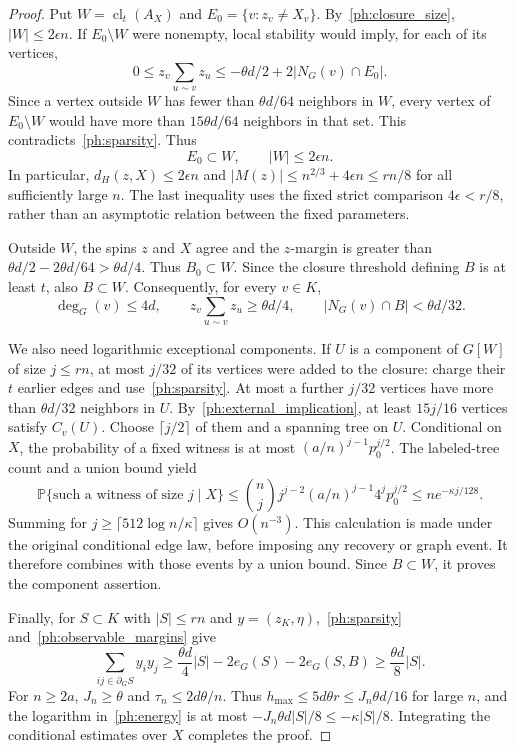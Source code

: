\documentclass[11pt]{article}
\def\P{\mathbb{P}}
\numberwithin{equation}{section}
\begin{document}
\begin{proof}
Put $W=\operatorname{cl}_t(A_X)$ and $E_0=\{v:z_v\ne X_v\}$. By~\eqref{ph:closure_size}, $|W|\le2\epsilon n$. If $E_0\setminus W$ were nonempty, local stability would imply, for each of its vertices,
\[
    0\le z_v\sum_{u\sim v}z_u
       \le-\theta d/2+2|N_G(v)\cap E_0|.
\]
Since a vertex outside $W$ has fewer than $\theta d/64$ neighbors in $W$, every vertex of $E_0\setminus W$ would have more than $15\theta d/64$ neighbors in that set. This contradicts~\eqref{ph:sparsity}. Thus
\begin{equation}\label{ph:confined}
    E_0\subset W,\qquad |W|\le2\epsilon n.
\end{equation}
In particular, $d_H(z,X)\le2\epsilon n$ and
$|M(z)|\le n^{2/3}+4\epsilon n\le rn/8$ for all sufficiently large $n$. The last inequality uses the fixed strict comparison $4\epsilon<r/8$, rather than an asymptotic relation between the fixed parameters.

Outside $W$, the spins $z$ and $X$ agree and the $z$-margin is greater than $\theta d/2-2\theta d/64>\theta d/4$. Thus $B_0\subset W$. Since the closure threshold defining $B$ is at least $t$, also $B\subset W$. Consequently, for every $v\in K$,
\begin{equation}\label{ph:observable_margins}
    \deg_G(v)\le4d,\qquad
    z_v\sum_{u\sim v}z_u\ge\theta d/4,\qquad
    |N_G(v)\cap B|<\theta d/32.
\end{equation}

We also need logarithmic exceptional components. If $U$ is a component of $G[W]$ of size $j\le rn$, at most $j/32$ of its vertices were added to the closure: charge their $t$ earlier edges and use~\eqref{ph:sparsity}. At most a further $j/32$ vertices have more than $\theta d/32$ neighbors in $U$. By~\eqref{ph:external_implication}, at least $15j/16$ vertices satisfy $C_v(U)$. Choose $\lceil j/2\rceil$ of them and a spanning tree on $U$. Conditional on $X$, the probability of a fixed witness is at most $(a/n)^{j-1}p_0^{j/2}$. The labeled-tree count and a union bound yield
\[
 \P\{\text{such a witness of size }j\mid X\}
 \le \binom{n}{j}j^{j-2}(a/n)^{j-1}4^jp_0^{j/2}
 \le n e^{-\kappa j/128}.
\]
Summing for $j\ge\lceil512\log n/\kappa\rceil$ gives $O(n^{-3})$. This calculation is made under the original conditional edge law, before imposing any recovery or graph event. It therefore combines with those events by a union bound. Since $B\subset W$, it proves the component assertion.

Finally, for $S\subset K$ with $|S|\le rn$ and $y=(z_K,\eta)$,~\eqref{ph:sparsity} and~\eqref{ph:observable_margins} give
\[
 \sum_{ij\in\partial_G S}y_iy_j
 \ge\frac{\theta d}{4}|S|-2e_G(S)-2e_G(S,B)
 \ge\frac{\theta d}{8}|S|.
\]
For $n\ge2a$, $J_n\ge\theta$ and $\tau_n\le2d\theta/n$. Thus $h_{\max}\le5d\theta r\le J_n\theta d/16$ for large $n$, and the logarithm in~\eqref{ph:energy} is at most $-J_n\theta d|S|/8\le-\kappa|S|/8$. Integrating the conditional estimates over $X$ completes the proof.
\end{proof}
\end{document}
